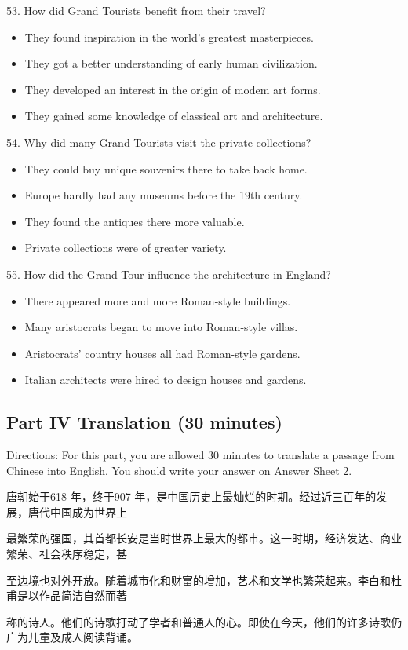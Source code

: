\documentclass[UTF8,11pt]{ctexart}
\begin{document}
53. How did Grand Tourists benefit from their travel?


\begin{itemize}[leftmargin=2em,itemsep=.2em,topsep=.4em]\item[A.] They found inspiration in the world's greatest masterpieces.
\item[B.] They got a better understanding of early human civilization.
\item[C.] They developed an interest in the origin of modem art forms.
\item[D.] They gained some knowledge of classical art and architecture.
\end{itemize}

54. Why did many Grand Tourists visit the private collections?


\begin{itemize}[leftmargin=2em,itemsep=.2em,topsep=.4em]\item[A.] They could buy unique souvenirs there to take back home.
\item[B.] Europe hardly had any museums before the 19th century.
\item[C.] They found the antiques there more valuable.
\item[D.] Private collections were of greater variety.
\end{itemize}

55. How did the Grand Tour influence the architecture in England?


\begin{itemize}[leftmargin=2em,itemsep=.2em,topsep=.4em]\item[A.] There appeared more and more Roman-style buildings.
\item[B.] Many aristocrats began to move into Roman-style villas.
\item[C.] Aristocrats' country houses all had Roman-style gardens.
\item[D.] Italian architects were hired to design houses and gardens.
\end{itemize}

\subsection*{\textbf{Part IV Translation (30 minutes)}}


Directions: For this part, you are allowed 30 minutes to translate a passage from Chinese into English. You should write your answer on Answer Sheet 2.


唐朝始于618 年，终于907 年，是中国历史上最灿烂的时期。经过近三百年的发展，唐代中国成为世界上


最繁荣的强国，其首都长安是当时世界上最大的都市。这一时期，经济发达、商业繁荣、社会秩序稳定，甚


至边境也对外开放。随着城市化和财富的增加，艺术和文学也繁荣起来。李白和杜甫是以作品简洁自然而著


称的诗人。他们的诗歌打动了学者和普通人的心。即使在今天，他们的许多诗歌仍广为儿童及成人阅读背诵。
\end{document}
